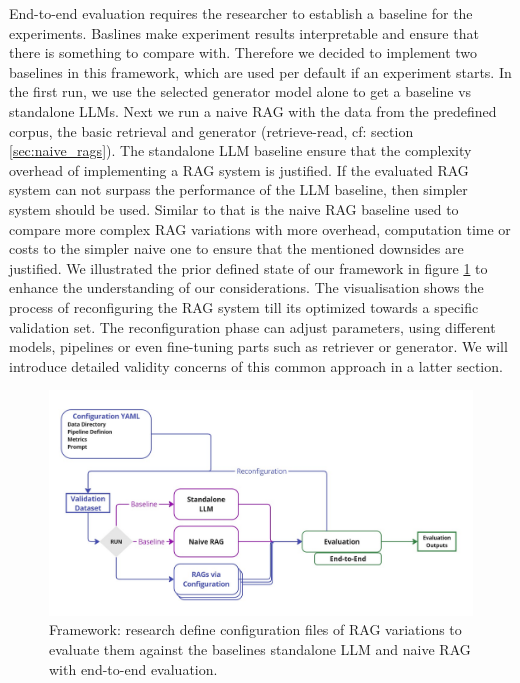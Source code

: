 End-to-end evaluation requires the researcher to establish a baseline for the experiments. Baslines make experiment results interpretable and ensure that there is something to compare with. Therefore we decided to implement two baselines in this framework, which are used per default if an experiment starts. In the first run, we use the selected generator model alone to get a baseline vs standalone LLMs. Next we run a naive RAG with the data from the predefined corpus, the basic retrieval and generator (retrieve-read, cf: section \ref{sec:naive_rags}). The standalone LLM baseline ensure that the complexity overhead of implementing a RAG system is justified. If the evaluated RAG system can not surpass the performance of the LLM baseline, then simpler system should be used. Similar to that is the naive RAG baseline used to compare more complex RAG variations with more overhead, computation time or costs to the simpler naive one to ensure that the mentioned downsides are justified. We illustrated the prior defined state of our framework in figure \ref{fig:framework-baselines} to enhance the understanding of our considerations. The visualisation shows the process of reconfiguring the RAG system till its optimized towards a specific validation set. The reconfiguration phase can adjust parameters, using different models, pipelines or even fine-tuning parts such as retriever or generator. We will introduce detailed validity concerns of this common approach in a latter section.

\begin{figure}
  \centering
  \includegraphics[width=\textwidth]{images/FrameworkBaselines.pdf}
  \caption{Framework: research define configuration files of RAG variations to evaluate them against the baselines standalone LLM and naive RAG with end-to-end evaluation.}
  \label{fig:framework-baselines}
\end{figure}

